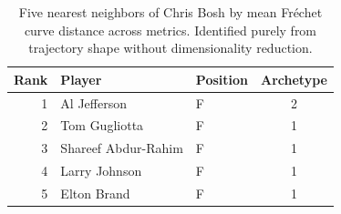 \begin{table}[htbp]
  \centering\small
  \begin{tabular}{rllc}
    \toprule
    Rank & Player & Position & Archetype \\
    \midrule
    1 & Al Jefferson & F & 2 \\
    2 & Tom Gugliotta & F & 1 \\
    3 & Shareef Abdur-Rahim & F & 1 \\
    4 & Larry Johnson & F & 1 \\
    5 & Elton Brand & F & 1 \\
    \bottomrule
  \end{tabular}
  \caption{Five nearest neighbors of Chris Bosh by mean Fr\'{e}chet curve distance across metrics. Identified purely from trajectory shape without dimensionality reduction.}
  \label{tab:Chris_Bosh_frechet_curve_neighbors}
\end{table}

